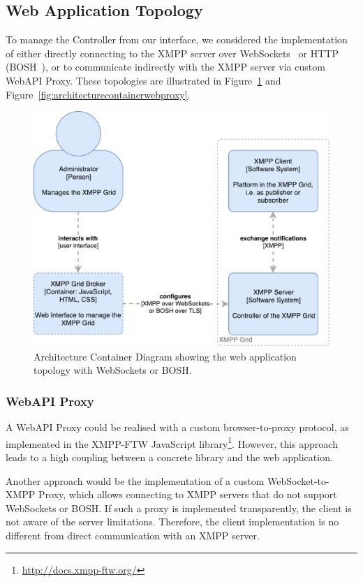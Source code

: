 \subsection{Web Application Topology}

To manage the Controller from our interface, we considered the implementation of either directly connecting to the XMPP server over WebSockets~\cite{rfc7395} or HTTP (BOSH~\cite{xep-0124}), or to communicate indirectly with the XMPP server via custom WebAPI Proxy.
These topologies are illustrated in Figure~\ref{fig:architecturecontainerwebapplication} and Figure~\ref{fig:architecturecontainerwebproxy}.

\begin{figure}[h]
\centering
\includegraphics[width=0.7\linewidth]{resources/architecture_container_webapplication}
\caption[Architecture Container Diagram: Web Application]{Architecture Container Diagram showing the web application topology with WebSockets or BOSH.}
\label{fig:architecturecontainerwebapplication}
\end{figure}

\subsubsection{WebAPI Proxy}

A WebAPI Proxy could be realised with a custom browser-to-proxy protocol, as implemented in the XMPP-FTW JavaScript library\footnote{\url{http://docs.xmpp-ftw.org/}}.
However, this approach leads to a high coupling between a concrete library and the web application.

Another approach would be the implementation of a custom WebSocket-to-XMPP Proxy, which allows connecting to XMPP servers that do not support WebSockets or BOSH.
If such a proxy is implemented transparently, the client is not aware of the server limitations.
Therefore, the client implementation is no different from direct communication with an XMPP server.

